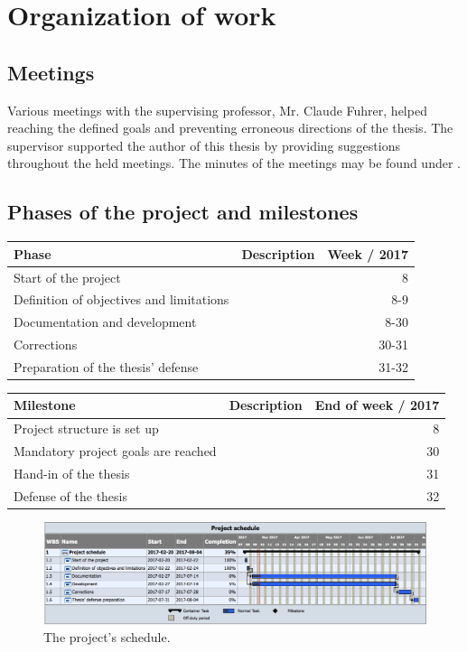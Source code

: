 \documentclass[10pt, openright, notitlepage]{scrreprt}
\begin{document}
\section{Organization of work}
\label{sec:org0f7eab5}
\subsection{Meetings}
\label{sec:org48e6332}

Various meetings with the supervising professor, Mr. Claude Fuhrer, helped
reaching the defined goals and preventing erroneous directions of the thesis.
The supervisor supported the author of this thesis by providing suggestions
throughout the held meetings. The minutes of the meetings may be found under
\label{Meeting minutes}.

\subsection{Phases of the project and milestones}
\label{sec:orgc72c569}


\begin{center}
\begin{tabular}{llr}
Phase & Description & Week / 2017\\
\hline
Start of the project &  & 8\\
Definition of objectives and limitations &  & 8-9\\
Documentation and development &  & 8-30\\
Corrections &  & 30-31\\
Preparation of the thesis' defense &  & 31-32\\
\end{tabular}
\end{center}

\begin{center}
\begin{tabular}{llr}
Milestone & Description & End of week / 2017\\
\hline
Project structure is set up &  & 8\\
Mandatory project goals are reached &  & 30\\
Hand-in of the thesis &  & 31\\
Defense of the thesis &  & 32\\
\end{tabular}
\end{center}

\begin{figure}[H]
\centering
\includegraphics[width=.9\linewidth]{./images/project_schedule.png}
\caption{\label{fig:schedule}
The project's schedule.}
\end{figure}
\end{document}
